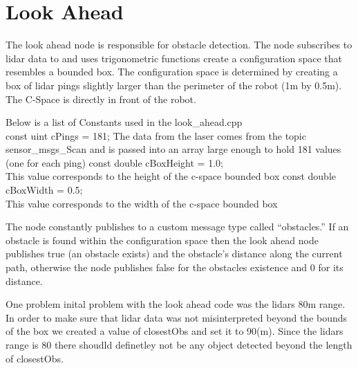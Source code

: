 \documentclass{article}
\begin{document}
\section{Look Ahead}

The look ahead node is responsible for obstacle detection. The node subscribes to lidar data to and uses trigonometric functions create a configuration space that resembles a bounded box. The configuration space is determined by creating a box of lidar pings slightly larger than the perimeter of the robot (1m by 0.5m). The C-Space is directly in front of the robot. 

Below is a list of Constants used in the look_ahead.cpp\\
const uint cPings = 181; The data from the laser comes from the topic sensor_msgs\Laser_Scan and is passed into an array large enough to hold 181 values (one for each ping)
const double cBoxHeight = 1.0;\\ This value corresponds to the height of the c-space bounded box
const double cBoxWidth = 0.5; \\ This value corresponds to the width of the c-space bounded box

The node constantly publishes to a custom message type called ``obstacles.'' If an obstacle is found within the configuration space then the look ahead node publishes true (an obstacle exists) and the obstacle's distance along the current path, otherwise the node publishes false for the obstacles existence and 0 for its distance. 

One problem inital problem with the look ahead code was the lidars 80m range. In order to make sure that lidar data was not misinterpreted beyond the bounds of the box we created a value of closestObs and set it to 90(m). Since the lidars range is 80 there shoudld definetley not be any object detected beyond the length of closestObs.
\end{document}
